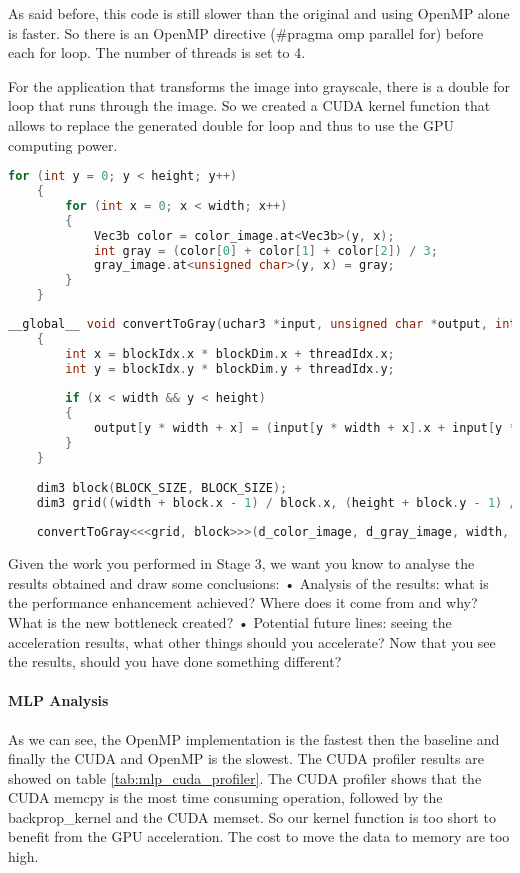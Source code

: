 \documentclass[11pt]{article}
\begin{document}
As said before, this code is still slower than the original and using OpenMP alone is faster.
So there is an OpenMP directive (\#pragma omp parallel for) before each for loop.
The number of threads is set to 4.

For the application that transforms the image into grayscale, there is a double for loop that runs through the image.
So we created a CUDA kernel function that allows to replace the generated double for loop and thus to use the GPU computing power.

\begin{lstlisting}[language=C, caption="Original grayscale code"]
	for (int y = 0; y < height; y++)
	{
		for (int x = 0; x < width; x++)
		{
			Vec3b color = color_image.at<Vec3b>(y, x);
			int gray = (color[0] + color[1] + color[2]) / 3;
			gray_image.at<unsigned char>(y, x) = gray;
		}
	}
\end{lstlisting}


\begin{lstlisting}[language=C, caption="CUDA kernel function to convert image to grayscale"]
	__global__ void convertToGray(uchar3 *input, unsigned char *output, int width, int height)
	{
		int x = blockIdx.x * blockDim.x + threadIdx.x;
		int y = blockIdx.y * blockDim.y + threadIdx.y;
	
		if (x < width && y < height)
		{
			output[y * width + x] = (input[y * width + x].x + input[y * width + x].y + input[y * width + x].z) / 3;
		}
	}
	
	dim3 block(BLOCK_SIZE, BLOCK_SIZE);
	dim3 grid((width + block.x - 1) / block.x, (height + block.y - 1) / block.y);
	
	convertToGray<<<grid, block>>>(d_color_image, d_gray_image, width, height);
\end{lstlisting}


\pagebreak
{}

Given the work you performed in Stage 3, we want you know to analyse the results obtained and draw
some conclusions:
• Analysis of the results: what is the performance enhancement achieved? Where does it come
from and why? What is the new bottleneck created?
• Potential future lines: seeing the acceleration results, what other things should you accelerate?
Now that you see the results, should you have done something different?

\paragraph*{MLP Analysis} As we can see, the OpenMP implementation is the fastest then the baseline and finally the CUDA and OpenMP is the slowest.
The CUDA profiler results are showed on table \ref{tab:mlp_cuda_profiler}.
The CUDA profiler shows that the CUDA memcpy is the most time consuming operation, followed by the backprop\_kernel and the CUDA memset.
So our kernel function is too short to benefit from the GPU acceleration. The cost to move the data to memory are too high.
\end{document}
